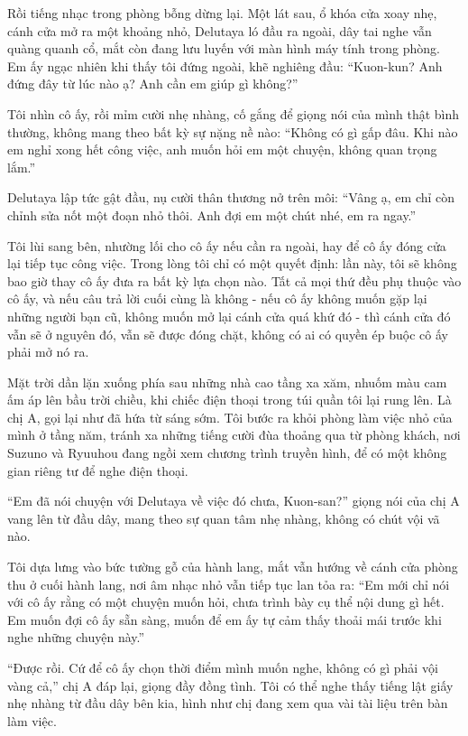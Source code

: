 \documentclass[../main.tex]{subfiles}
\begin{document}
Rồi tiếng nhạc trong phòng bỗng dừng lại. Một lát sau, ổ khóa cửa xoay nhẹ, cánh cửa mở ra một khoảng nhỏ, Delutaya ló đầu ra ngoài, dây tai nghe vẫn quàng quanh cổ, mắt còn đang lưu luyến với màn hình máy tính trong phòng. Em ấy ngạc nhiên khi thấy tôi đứng ngoài, khẽ nghiêng đầu: ``Kuon-kun? Anh đứng đây từ lúc nào ạ? Anh cần em giúp gì không?''

Tôi nhìn cô ấy, rồi mỉm cười nhẹ nhàng, cố gắng để giọng nói của mình thật bình thường, không mang theo bất kỳ sự nặng nề nào: ``Không có gì gấp đâu. Khi nào em nghỉ xong hết công việc, anh muốn hỏi em một chuyện, không quan trọng lắm.''

Delutaya lập tức gật đầu, nụ cười thân thương nở trên môi: ``Vâng ạ, em chỉ còn chỉnh sửa nốt một đoạn nhỏ thôi. Anh đợi em một chút nhé, em ra ngay.''

Tôi lùi sang bên, nhường lối cho cô ấy nếu cần ra ngoài, hay để cô ấy đóng cửa lại tiếp tục công việc. Trong lòng tôi chỉ có một quyết định: lần này, tôi sẽ không bao giờ thay cô ấy đưa ra bất kỳ lựa chọn nào. Tất cả mọi thứ đều phụ thuộc vào cô ấy, và nếu câu trả lời cuối cùng là không - nếu cô ấy không muốn gặp lại những người bạn cũ, không muốn mở lại cánh cửa quá khứ đó - thì cánh cửa đó vẫn sẽ ở nguyên đó, vẫn sẽ được đóng chặt, không có ai có quyền ép buộc cô ấy phải mở nó ra.

Mặt trời dần lặn xuống phía sau những nhà cao tầng xa xăm, nhuốm màu cam ấm áp lên bầu trời chiều, khi chiếc điện thoại trong túi quần tôi lại rung lên. Là chị A, gọi lại như đã hứa từ sáng sớm. Tôi bước ra khỏi phòng làm việc nhỏ của mình ở tầng năm, tránh xa những tiếng cười đùa thoảng qua từ phòng khách, nơi Suzuno và Ryuuhou đang ngồi xem chương trình truyền hình, để có một không gian riêng tư để nghe điện thoại.

``Em đã nói chuyện với Delutaya về việc đó chưa, Kuon-san?'' giọng nói của chị A vang lên từ đầu dây, mang theo sự quan tâm nhẹ nhàng, không có chút vội vã nào.

Tôi dựa lưng vào bức tường gỗ của hành lang, mắt vẫn hướng về cánh cửa phòng thu ở cuối hành lang, nơi âm nhạc nhỏ vẫn tiếp tục lan tỏa ra: ``Em mới chỉ nói với cô ấy rằng có một chuyện muốn hỏi, chưa trình bày cụ thể nội dung gì hết. Em muốn đợi cô ấy sẵn sàng, muốn để em ấy tự cảm thấy thoải mái trước khi nghe những chuyện này.''

``Được rồi. Cứ để cô ấy chọn thời điểm mình muốn nghe, không có gì phải vội vàng cả,'' chị A đáp lại, giọng đầy đồng tình. Tôi có thể nghe thấy tiếng lật giấy nhẹ nhàng từ đầu dây bên kia, hình như chị đang xem qua vài tài liệu trên bàn làm việc.
\end{document}
